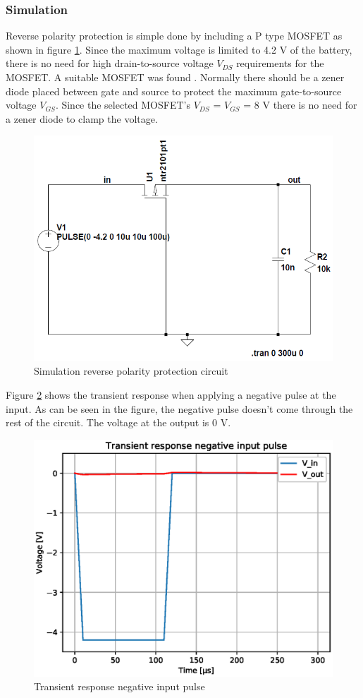 \documentclass[11pt,a4paper]{article}
\begin{document}
\subsubsection{Simulation}\label{sec:reverse_pol_prot_sim}
Reverse polarity protection is simple done by including a P type MOSFET as shown in figure \ref{fig:reverse_polarity_protection_simulation}. Since the maximum voltage is limited to 4.2 V of the battery, there is no need for high drain-to-source voltage $V_{DS}$ requirements for the MOSFET. A suitable MOSFET was found \cite{bib:NTR2101P}. Normally there should be a zener diode placed between gate and source to protect the maximum gate-to-source voltage $V_{GS}$. Since the selected MOSFET's $V_{DS}$ = $V_{GS}$ = 8 V there is no need for a zener diode to clamp the voltage. 
\begin{figure}[H]
	\centering
	\includegraphics[width=0.8\linewidth]{reverse_polarity_protection_simulation.png}
	\caption{Simulation reverse polarity protection circuit}
	\label{fig:reverse_polarity_protection_simulation}
\end{figure}
Figure \ref{fig:Transient_response_negative_input_pulse} shows the transient response when applying a negative pulse at the input. As can be seen in the figure, the negative pulse doesn't come through the rest of the circuit. The voltage at the output is 0 V.
\begin{figure}[H]
	\centering
	\includegraphics[width=0.8\linewidth]{Transient_response_negative_input_pulse.eps}
	\caption{Transient response negative input pulse}
	\label{fig:Transient_response_negative_input_pulse}
\end{figure}
\end{document}
